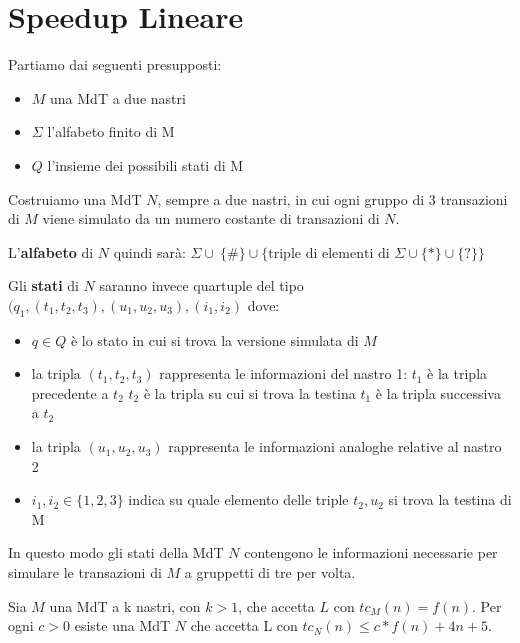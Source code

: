 \section{Speedup Lineare}

Partiamo dai seguenti presupposti:

\begin{itemize}
	\item $M$ una MdT a due nastri
	\item $\Sigma$ l'alfabeto finito di M
	\item $Q$ l'insieme dei possibili stati di M
\end{itemize}

Costruiamo una MdT $N$, sempre a due nastri, in cui ogni gruppo di 3 transazioni di $M$ viene simulato da un numero costante di transazioni di $N$.

L'\textbf{alfabeto} di $N$ quindi sarà: $ \Sigma \cup \ \{\#\} \cup \{ \text{triple di elementi di } \Sigma \cup \{\ast\} \cup \{?\} \} $

Gli \textbf{stati} di $N$ saranno invece quartuple del tipo $(q_1, (t_1, t_2, t_3), (u_1, u_2, u_3), (i_1, i_2)$ dove:

\begin{itemize}
	\item $q \in Q$ è lo stato in cui si trova la versione simulata di $M$
	\item la tripla $(t_1, t_2, t_3)$ rappresenta le informazioni del nastro 1:
		\subitem $t_1$ è la tripla precedente a $t_2$
		\subitem $t_2$ è la tripla su cui si trova la testina
		\subitem $t_1$ è la tripla successiva a $t_2$
	\item la tripla $(u_1, u_2, u_3)$ rappresenta le informazioni analoghe relative al nastro 2
	\item $i_1, i_2 \in \{1, 2, 3\}$ indica su quale elemento delle triple $t_2, u_2$ si trova la testina di M
\end{itemize}

In questo modo gli stati della MdT $N$ contengono le informazioni necessarie per simulare le transazioni di $M$ a gruppetti di tre per volta. \\

\begin{lemm}
	Sia $M$ una MdT a k nastri, con $k > 1$, che accetta $L$ con $tc_M(n) = f(n)$.
	Per ogni $c > 0$ esiste una MdT $N$ che accetta L con $tc_N(n) \leq c*f(n) + 4n + 5$.
\end{lemm}

